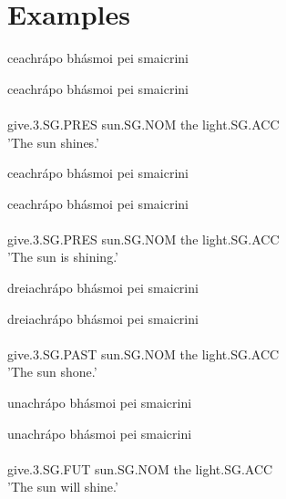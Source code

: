 \documentclass{article}
\begin{document}
\part{Examples}
\begin{exe}
\ex \begin{ogham} ceachrápo bhásmoi pei smaicrini \end{ogham}
\glll ceachrápo bhásmoi pei smaicrini\\
   \\
give.3.SG.PRES sun.SG.NOM the light.SG.ACC\\
\trans 'The sun shines.'
\end{exe}
\begin{exe}
\ex \begin{ogham} ceachrápo bhásmoi pei smaicrini \end{ogham}
\glll ceachrápo bhásmoi pei smaicrini\\
   \\
give.3.SG.PRES sun.SG.NOM the light.SG.ACC\\
\trans 'The sun is shining.'
\end{exe}
\begin{exe}
\ex \begin{ogham} dreiachrápo bhásmoi pei smaicrini \end{ogham}
\glll dreiachrápo bhásmoi pei smaicrini\\
   \\
give.3.SG.PAST sun.SG.NOM the light.SG.ACC\\
\trans 'The sun shone.'
\end{exe}
\begin{exe}
\ex \begin{ogham} unachrápo bhásmoi pei smaicrini \end{ogham}
\glll unachrápo bhásmoi pei smaicrini\\
   \\
give.3.SG.FUT sun.SG.NOM the light.SG.ACC\\
\trans 'The sun will shine.'
\end{exe}
\end{document}
